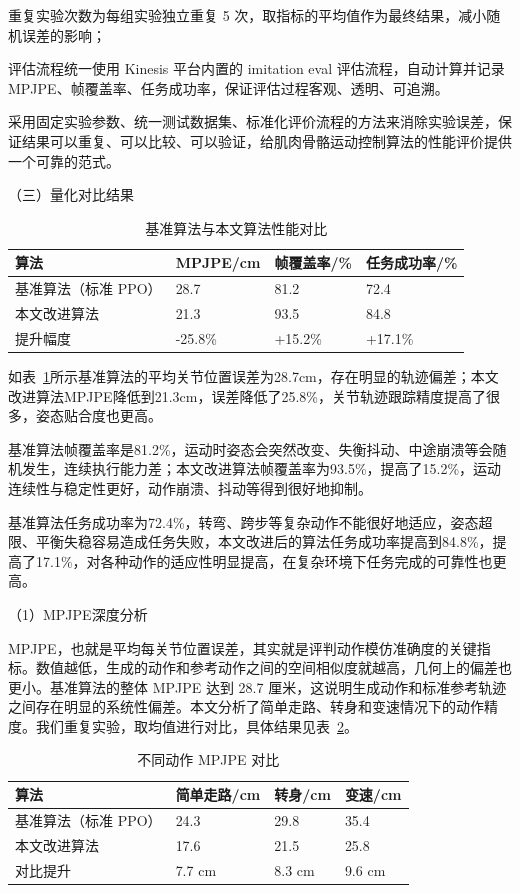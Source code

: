 重复实验次数为每组实验独立重复 5
次，取指标的平均值作为最终结果，减小随机误差的影响；

评估流程统一使用 Kinesis 平台内置的 imitation eval
评估流程，自动计算并记录
MPJPE、帧覆盖率、任务成功率，保证评估过程客观、透明、可追溯。

采用固定实验参数、统一测试数据集、标准化评价流程的方法来消除实验误差，保证结果可以重复、可以比较、可以验证，给肌肉骨骼运动控制算法的性能评价提供一个可靠的范式。

（三）量化对比结果

\begin{table}[htbp]
\centering
\caption{基准算法与本文算法性能对比}
\label{tab:4-3}
\small
\begin{tabularx}{\textwidth}{lXXX}
\toprule
算法 & MPJPE/cm & 帧覆盖率/\% & 任务成功率/\% \\
\midrule
基准算法（标准 PPO） & 28.7 & 81.2 & 72.4 \\
本文改进算法 & 21.3 & 93.5 & 84.8 \\
提升幅度 & -25.8\% & +15.2\% & +17.1\% \\
\bottomrule
\end{tabularx}
\end{table}

如表~\ref{tab:4-3}所示基准算法的平均关节位置误差为28.7cm，存在明显的轨迹偏差；本文改进算法MPJPE降低到21.3cm，误差降低了25.8\%，关节轨迹跟踪精度提高了很多，姿态贴合度也更高。

基准算法帧覆盖率是81.2\%，运动时姿态会突然改变、失衡抖动、中途崩溃等会随机发生，连续执行能力差；本文改进算法帧覆盖率为93.5\%，提高了15.2\%，运动连续性与稳定性更好，动作崩溃、抖动等得到很好地抑制。

基准算法任务成功率为72.4\%，转弯、跨步等复杂动作不能很好地适应，姿态超限、平衡失稳容易造成任务失败，本文改进后的算法任务成功率提高到84.8\%，提高了17.1\%，对各种动作的适应性明显提高，在复杂环境下任务完成的可靠性也更高。

（1）MPJPE深度分析

MPJPE，也就是平均每关节位置误差，其实就是评判动作模仿准确度的关键指标。数值越低，生成的动作和参考动作之间的空间相似度就越高，几何上的偏差也更小。基准算法的整体
MPJPE 达到 28.7
厘米，这说明生成动作和标准参考轨迹之间存在明显的系统性偏差。本文分析了简单走路、转身和变速情况下的动作精度。我们重复实验，取均值进行对比，具体结果见表~\ref{tab:4-4}。

\begin{table}[htbp]
\centering
\caption{不同动作 MPJPE 对比}
\label{tab:4-4}
\small
\begin{tabularx}{\textwidth}{lXXX}
\toprule
算法 & 简单走路/cm & 转身/cm & 变速/cm \\
\midrule
基准算法（标准 PPO） & 24.3 & 29.8 & 35.4 \\
本文改进算法 & 17.6 & 21.5 & 25.8 \\
对比提升 & 7.7 cm & 8.3 cm & 9.6 cm \\
\bottomrule
\end{tabularx}
\end{table}

